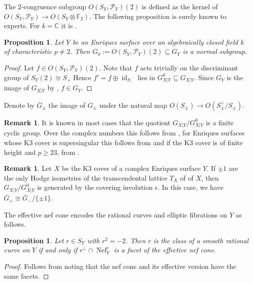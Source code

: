 \documentclass{amsart}
\theoremstyle{definition}
\newtheorem{remark}[definition]{Remark}
\theoremstyle{plain}
\newtheorem{proposition}[definition]{Proposition}
\DeclareMathOperator{\Nef}{Nef}
\DeclareMathOperator{\id}{id}
\newcommand{\FF}{\mathbb{F}}
\newcommand{\CC}{\mathbb{C}}
\renewcommand{\P}{\mathcal{P}}
\newcommand{\Gbar}{\overline{G}}
\begin{document}
The $2$-congruence subgroup $O(S_Y,\P_Y)(2)$ is defined as the kernel of
$O(S_Y,\P_Y) \to O(S_Y \otimes \FF_2)$.
The following proposition is surely known to experts.
For $k=\CC$ it is \cite[Theorem 5.5.1]{cdl:enriquesI}.
\begin{proposition}\label{prop:G0}
Let $Y$ be an Enriques surface over an algebraically closed field $k$ of characteristic $p\neq2$.
Then $G_0:=O(S_Y,\P_Y)(2) \subseteq G_Y$ is a normal subgroup.
\end{proposition}
\begin{proof}
Let $f\in O(S_Y,\P_Y)(2)$. Note that $f$ acts trivially on the discriminant group of $S_Y(2) \cong S_+$
Hence $f'=f\oplus \id_{S_-}$ lies in $G^0_{X|Y} \subseteq G_{X|Y}$.
Since $G_Y$ is the image of $G_{X|Y}$ by , $f \in G_Y$.
\end{proof}
Denote by $\Gbar_\pm$ the image of $G_\pm$ under the natural map $O(S_\pm) \to O(S_\pm^\vee/S_\pm)$.
\begin{remark}
It is known in most cases that the quotient $G_{X|Y}/G_{X|Y}^0$ is a finite cyclic group.
Over the complex numbers this follows from \cite[Corollary 3.3]{nikulin:auto}, for Enriques surfaces whose K3 cover is supersingular this follows from \cite[Proposition 3.1]{jang:representation} and if the K3 cover is of finite height and $p\geq 23$, from \cite[Proposition 3.10]{jang:representation}.  \\
\end{remark}
\begin{remark}
Let $X$ be the K3 cover of a complex Enriques surface $Y$. If \(\pm 1\) are the only Hodge isometries of the transcendental lattice $T_X$ of of $X$, then $G_{X|Y}/G_{X|Y}^0$ is generated by the covering involution $\epsilon$. In this case, \cite[(3.4)]{brandhorst_shimada:tautaubar} we have $\Gbar_+ \cong \Gbar_-/\{\pm 1\}$.
\end{remark}

The effective nef cone encodes the rational curves and elliptic fibrations on $Y$ as follows.
\begin{proposition} \label{prop:class-smooth-rational-curve-facet}
Let $r \in S_Y$ with $r^2 = -2$. Then $r$ is the class of a smooth rational curve on $Y$ if and only if $r^\perp \cap \Nef^{e}_Y$ is a facet of the effective nef cone.
\end{proposition}
\begin{proof}
Follows from \cite[Proposition 2.2.1]{cdl:enriquesI} noting that the nef cone and its effective version have the same facets.
\end{proof}
\end{document}
